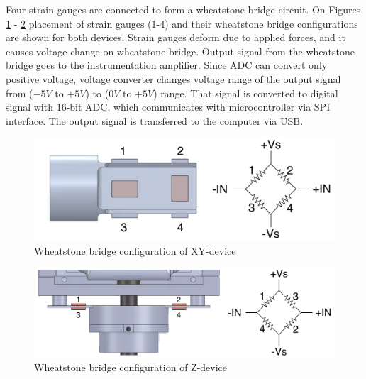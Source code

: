Four strain gauges are connected to form a wheatstone bridge circuit. On Figures \ref{fig:WB_xy_dev} - \ref{fig:WB_z} placement of strain gauges (1-4) and their wheatstone bridge configurations are shown for both devices. Strain gauges deform due to applied forces, and it causes voltage change on wheatstone bridge. Output signal from the wheatstone bridge goes to the instrumentation amplifier. Since ADC can convert only positive voltage, voltage converter changes voltage range of the output signal from ($-5V$ to $+5V$) to ($0V$ to $+5V$) range. That signal is converted to digital signal with 16-bit ADC, which communicates with microcontroller via SPI interface. The output signal is transferred to the computer via USB. 
	
\begin{figure}[h]
	\begin{center}
		\includegraphics[width=120mm]{fig/methods/Wiring_xy_sleeve.pdf}
	\end{center}
	\vspace{-4mm}
	\caption[Wheatstone bridge configuration of XY-device]
	{Wheatstone bridge configuration of XY-device}
	\label{fig:WB_xy_dev}
	\vspace{-2mm}
\end{figure}

\begin{figure}[h]
	\begin{center}
		\includegraphics[width=140mm]{fig/methods/Wiring_z.pdf}
	\end{center}
	\vspace{-4mm}
	\caption[Wheatstone bridge configuration of Z-device]
	{Wheatstone bridge configuration of Z-device}
	\label{fig:WB_z}
	\vspace{-2mm}
\end{figure}
	
